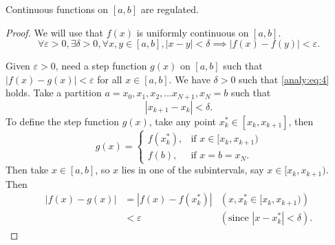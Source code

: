 \documentclass[10pt, a4paper]{article}
\begin{document}
\begin{theorem}
    Continuous functions on $[a, b]$ are regulated.

    \begin{proof}
        We will use that $f(x)$ is uniformly continuous on $[a, b]$.
        \begin{equation}\label{analy:eq:4}\tag{*}
            \forall \varepsilon > 0, \exists \delta > 0, \forall x, y \in [a, b], |x - y| < \delta \implies |f(x) - f(y)| < \varepsilon.
        \end{equation}

        Given $\varepsilon > 0$,
        need a step function $g(x)$ on $[a, b]$ such that $|f(x) - g(x)| < \varepsilon$ for all $x \in [a, b]$.
        We have $\delta > 0$ such that \eqref{analy:eq:4} holds.
        Take a partition $a = x_0, x_1, x_2, \dotsc x_{N + 1}, x_N = b$ such that
        \[
        |x_{k + 1} - x_k| < \delta.
        \]
        To define the step function $g(x)$,
        take any point $x_k ^ {*} \in [x_k, x_{k + 1}]$,
        then
        \[
        g(x) = \begin{cases}
            f(x_k ^ {*}), &\text{if } x \in [x_k, x_{k + 1}) \\
            f(b), &\text{if } x = b = x_N.
        \end{cases}
        \]
        Then take $x \in [a, b]$,
        so $x$ lies in one of the subintervals,
        say $x \in [x_k, x_{k + 1})$.
        Then
        \begin{align*}
            |f(x) - g(x)| &= |f(x) - f(x_k ^ {*})| &(\text{$x, x_k ^ {*} \in [x_k, x_{k + 1})$}) \\
            &< \varepsilon &(\text{since $|x - x_k ^ {*}| < \delta$}).
        \end{align*}
    \end{proof}
\end{theorem}
\end{document}
